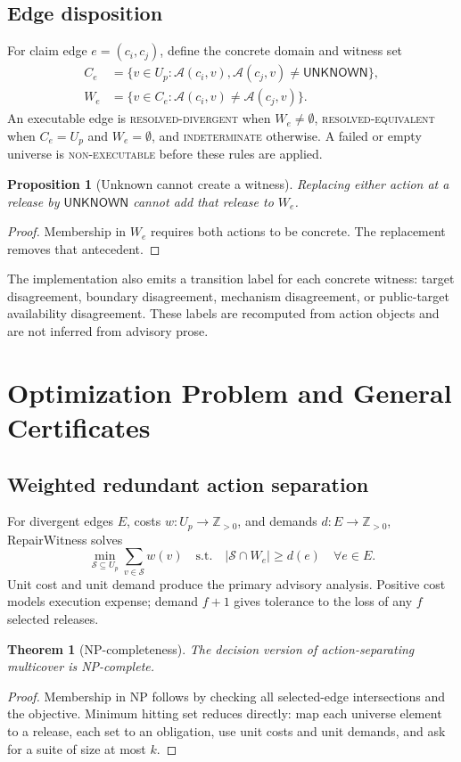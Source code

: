 \documentclass[10pt,conference]{IEEEtran}
\newtheorem{theorem}{Theorem}
\newtheorem{proposition}{Proposition}
\newcommand{\Act}{\mathcal{A}}
\newcommand{\Suit}{\mathcal{S}}
\newcommand{\unknown}{\ensuremath{\mathsf{UNKNOWN}}}
\begin{document}
\subsection{Edge disposition}
For claim edge $e=(c_i,c_j)$, define the concrete domain and witness set
\begin{align*}
C_e &= \{v\in U_p:\Act(c_i,v),\Act(c_j,v)\neq\unknown\},\\
W_e &= \{v\in C_e:\Act(c_i,v)\neq\Act(c_j,v)\}.
\end{align*}
An executable edge is \textsc{resolved-divergent} when $W_e\neq\emptyset$, \textsc{resolved-equivalent} when $C_e=U_p$ and $W_e=\emptyset$, and \textsc{indeterminate} otherwise. A failed or empty universe is \textsc{non-executable} before these rules are applied.

\begin{proposition}[Unknown cannot create a witness]
Replacing either action at a release by \unknown{} cannot add that release to $W_e$.
\end{proposition}
\begin{proof}
Membership in $W_e$ requires both actions to be concrete. The replacement removes that antecedent.
\end{proof}

The implementation also emits a transition label for each concrete witness: target disagreement, boundary disagreement, mechanism disagreement, or public-target availability disagreement. These labels are recomputed from action objects and are not inferred from advisory prose.

\section{Optimization Problem and General Certificates}
\subsection{Weighted redundant action separation}
For divergent edges $E$, costs $w:U_p\to\mathbb{Z}_{>0}$, and demands $d:E\to\mathbb{Z}_{>0}$, RepairWitness solves
\[
\min_{\Suit\subseteq U_p}\sum_{v\in\Suit}w(v)
\quad\text{s.t.}\quad
|\Suit\cap W_e|\ge d(e)\quad\forall e\in E.
\]
Unit cost and unit demand produce the primary advisory analysis. Positive cost models execution expense; demand $f+1$ gives tolerance to the loss of any $f$ selected releases.

\begin{theorem}[NP-completeness]
The decision version of action-separating multicover is NP-complete.
\end{theorem}
\begin{proof}
Membership in NP follows by checking all selected-edge intersections and the objective. Minimum hitting set reduces directly: map each universe element to a release, each set to an obligation, use unit costs and unit demands, and ask for a suite of size at most $k$.
\end{proof}
\end{document}
